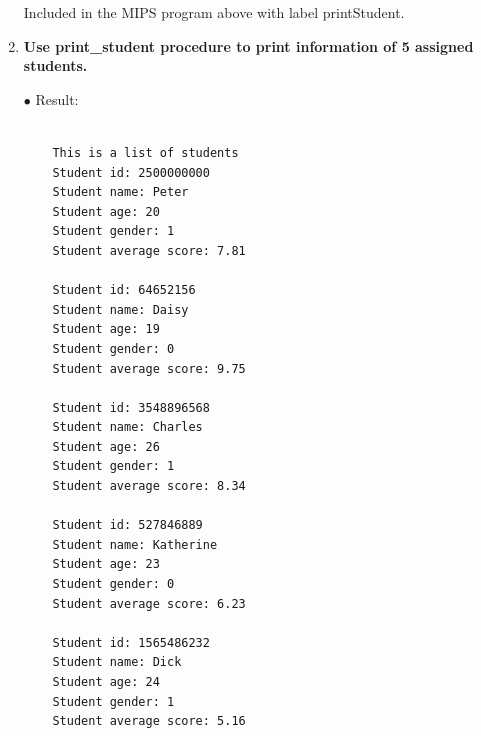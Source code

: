 \documentclass[12pt,a4paper]{article}
\begin{document}
\begin{enumerate}
        Included in the MIPS program above with label printStudent.


  \item \textbf{Use print\_student procedure to print information of 5 assigned students.}\\

  \item[\(\bullet\)] Result:\\

        \begin{mdframed}[hidealllines=true,backgroundcolor=magenta!10]
          \begin{lstlisting}

    This is a list of students
    Student id: 2500000000
    Student name: Peter
    Student age: 20
    Student gender: 1
    Student average score: 7.81

    Student id: 64652156
    Student name: Daisy
    Student age: 19
    Student gender: 0
    Student average score: 9.75

    Student id: 3548896568
    Student name: Charles
    Student age: 26
    Student gender: 1
    Student average score: 8.34

    Student id: 527846889
    Student name: Katherine
    Student age: 23
    Student gender: 0
    Student average score: 6.23

    Student id: 1565486232
    Student name: Dick
    Student age: 24
    Student gender: 1
    Student average score: 5.16

  \end{lstlisting}
        \end{mdframed}
\end{enumerate}
\end{document}
